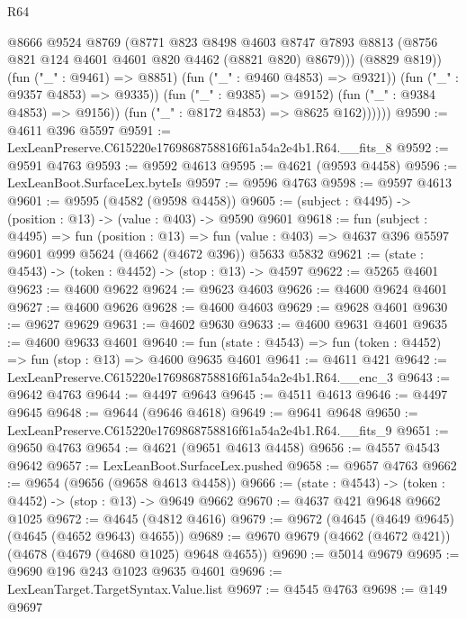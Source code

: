 \begin{lexlean}{R64}
\begin{coremodule}
                        @8666
                        @9524
                        @8769
                        (@8771
                          @823
                          @8498
                          @4603
                          @8747
                          @7893
                          @8813
                          (@8756 @821 @124 @4601 @4601 @820 @4462 (@8821 @820) @8679)))
                      (@8829 @819))
                    (fun ("_" : @9461) => @8851)
                    (fun ("_" : @9460 @4853) => @9321))
                  (fun ("_" : @9357 @4853) => @9335))
                (fun ("_" : @9385) => @9152)
                (fun ("_" : @9384 @4853) => @9156))
              (fun ("_" : @8172 @4853) => @8625 @162))))))
@9590 := @4611 @396 @5597
@9591 := LexLeanPreserve.C615220e1769868758816f61a54a2e4b1.R64.__fits_8
@9592 := @9591 @4763
@9593 := @9592 @4613
@9595 := @4621 (@9593 @4458)
@9596 := LexLeanBoot.SurfaceLex.byteIs
@9597 := @9596 @4763
@9598 := @9597 @4613
@9601 := @9595 (@4582 (@9598 @4458))
@9605 := (subject : @4495) -> (position : @13) -> (value : @403) -> @9590 @9601
@9618 := fun (subject : @4495) =>
  fun (position : @13) =>
  fun (value : @403) => @4637 @396 @5597 @9601 @999 @5624 (@4662 (@4672 @396)) @5633 @5832
@9621 := (state : @4543) -> (token : @4452) -> (stop : @13) -> @4597
@9622 := @5265 @4601
@9623 := @4600 @9622
@9624 := @9623 @4603
@9626 := @4600 @9624 @4601
@9627 := @4600 @9626
@9628 := @4600 @4603
@9629 := @9628 @4601
@9630 := @9627 @9629
@9631 := @4602 @9630
@9633 := @4600 @9631 @4601
@9635 := @4600 @9633 @4601
@9640 := fun (state : @4543) => fun (token : @4452) => fun (stop : @13) => @4600 @9635 @4601
@9641 := @4611 @421
@9642 := LexLeanPreserve.C615220e1769868758816f61a54a2e4b1.R64.__enc_3
@9643 := @9642 @4763
@9644 := @4497 @9643
@9645 := @4511 @4613
@9646 := @4497 @9645
@9648 := @9644 (@9646 @4618)
@9649 := @9641 @9648
@9650 := LexLeanPreserve.C615220e1769868758816f61a54a2e4b1.R64.__fits_9
@9651 := @9650 @4763
@9654 := @4621 (@9651 @4613 @4458)
@9656 := @4557 @4543 @9642
@9657 := LexLeanBoot.SurfaceLex.pushed
@9658 := @9657 @4763
@9662 := @9654 (@9656 (@9658 @4613 @4458))
@9666 := (state : @4543) -> (token : @4452) -> (stop : @13) -> @9649 @9662
@9670 := @4637 @421 @9648 @9662 @1025
@9672 := @4645 (@4812 @4616)
@9679 := @9672 (@4645 (@4649 @9645) (@4645 (@4652 @9643) @4655))
@9689 := @9670 @9679 (@4662 (@4672 @421)) (@4678 (@4679 (@4680 @1025) @9648 @4655))
@9690 := @5014 @9679
@9695 := @9690 @196 @243 @1023 @9635 @4601
@9696 := LexLeanTarget.TargetSyntax.Value.list
@9697 := @4545 @4763
@9698 := @149 @9697

\end{coremodule}
\end{lexlean}
